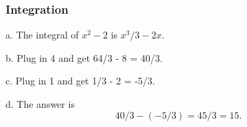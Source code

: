 \documentclass{beamer}
\begin{document}
\begin{frame}
	\frametitle{Integration}
	a.  The integral of $x^2 - 2$ is $x^3/3 - 2x$.
	
	b.  Plug in 4 and get 64/3 - 8 = 40/3.
	
	c.  Plug in 1 and get 1/3 - 2 = -5/3.
	
	d.  The answer is \[40/3 - (-5/3) = 45/3 = 15.\]
\end{frame}
\end{document}
